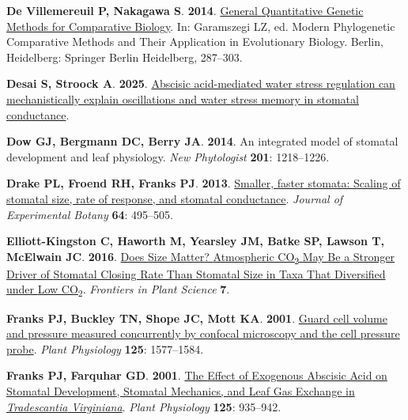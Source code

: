 \documentclass[
  letterpaper,
  DIV=11,
  numbers=noendperiod]{scrartcl}
\newlength{\cslhangindent}
\newenvironment{CSLReferences}[2] %
 {\begin{list}{}{%
  \setlength{\itemindent}{0pt}
  \setlength{\leftmargin}{0pt}
  \setlength{\parsep}{0pt}
  \ifodd #1
   \setlength{\leftmargin}{\cslhangindent}
   \setlength{\itemindent}{-1\cslhangindent}
  \fi
  \setlength{\itemsep}{#2\baselineskip}}}
 {\end{list}}
\begin{document}
\begin{CSLReferences}{0}{1}
\textbf{\textbf{De Villemereuil P}, \textbf{Nakagawa S}}. \textbf{2014}.
\href{https://doi.org/10.1007/978-3-662-43550-2_11}{General
{Quantitative Genetic Methods} for {Comparative Biology}}. In:
Garamszegi LZ, ed. Modern {Phylogenetic Comparative Methods} and {Their
Application} in {Evolutionary Biology}. Berlin, Heidelberg: Springer
Berlin Heidelberg, 287--303.

\textbf{\textbf{Desai S}, \textbf{Stroock A}}. \textbf{2025}.
\href{https://doi.org/10.64898/2025.12.26.696581}{Abscisic acid-mediated
water stress regulation can mechanistically explain oscillations and
water stress memory in stomatal conductance}.

\textbf{\textbf{Dow GJ}, \textbf{Bergmann DC}, \textbf{Berry JA}}.
\textbf{2014}. An integrated model of stomatal development and leaf
physiology. \emph{New Phytologist} \textbf{201}: 1218--1226.

\textbf{\textbf{Drake PL}, \textbf{Froend RH}, \textbf{Franks PJ}}.
\textbf{2013}. \href{https://doi.org/10.1093/jxb/ers347}{Smaller, faster
stomata: Scaling of stomatal size, rate of response, and stomatal
conductance}. \emph{Journal of Experimental Botany} \textbf{64}:
495--505.

\textbf{\textbf{Elliott-Kingston C}, \textbf{Haworth M},
\textbf{Yearsley JM}, \textbf{Batke SP}, \textbf{Lawson T},
\textbf{McElwain JC}}. \textbf{2016}.
\href{https://doi.org/10.3389/fpls.2016.01253}{Does {Size Matter}?
{Atmospheric CO}{\textsubscript{2}} {May Be} a {Stronger Driver} of
{Stomatal Closing Rate Than Stomatal Size} in {Taxa That Diversified}
under {Low CO}{\textsubscript{2}}}. \emph{Frontiers in Plant Science}
\textbf{7}.

\textbf{\textbf{Franks PJ}, \textbf{Buckley TN}, \textbf{Shope JC},
\textbf{Mott KA}}. \textbf{2001}.
\href{https://doi.org/10.1104/pp.125.4.1577}{Guard cell volume and
pressure measured concurrently by confocal microscopy and the cell
pressure probe}. \emph{Plant Physiology} \textbf{125}: 1577--1584.

\textbf{\textbf{Franks PJ}, \textbf{Farquhar GD}}. \textbf{2001}.
\href{https://doi.org/10.1104/pp.125.2.935}{The {Effect} of {Exogenous
Abscisic Acid} on {Stomatal Development}, {Stomatal Mechanics}, and
{Leaf Gas Exchange} in {\emph{Tradescantia}}{ \emph{Virginiana}}}.
\emph{Plant Physiology} \textbf{125}: 935--942.


\end{CSLReferences}
\end{document}
